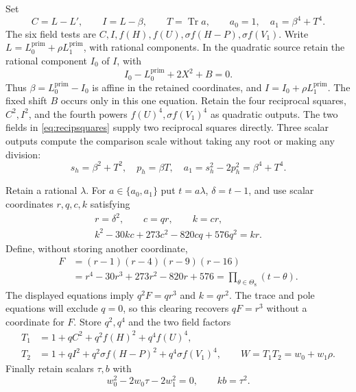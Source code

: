 \documentclass[11pt,a4paper]{article}
\DeclareMathOperator{\Tr}{Tr}\DeclareMathOperator{\Nm}{N}
\begin{document}
Set
\[
 C=L-L',\qquad I=L-\beta,\qquad T=\Tr a,
 \qquad a_0=1,\quad a_1=\beta^4+T^4.
\]
The six field tests are $C,I,f(H),f(U),\sigma f(H-P),\sigma f(V_1)$.
Write $L=L_0^{\mathrm{prim}}+\rho L_1^{\mathrm{prim}}$, with rational components.
In the quadratic source retain the rational component $I_0$ of $I$, with
\[
                  I_0-L_0^{\mathrm{prim}}+2X^2+B=0.
\]
Thus $\beta=L_0^{\mathrm{prim}}-I_0$ is affine in the retained
coordinates, and $I=I_0+\rho L_1^{\mathrm{prim}}$.
The fixed shift $B$ occurs only in this one equation.
Retain the four reciprocal squares, $C^2,I^2$, and the fourth powers
$f(U)^4,\sigma f(V_1)^4$ as quadratic outputs. The two fields in
\eqref{eq:recipsquares} supply two reciprocal squares directly.
Three scalar outputs compute the comparison scale without taking any
root or making any division:
\[
 s_h=\beta^2+T^2,\quad p_h=\beta T,\quad
 a_1=s_h^2-2p_h^2=\beta^4+T^4.
\]

Retain a rational $\lambda$. For $a\in\{a_0,a_1\}$ put $t=a\lambda$,
$\delta=t-1$, and use scalar coordinates $r,q,c,k$ satisfying
\begin{equation}\label{eq:contactcircuit}
 \begin{gathered}
 r=\delta^2,\qquad c=qr,\qquad k=cr,\\
 k^2-30kc+273c^2-820cq+576q^2=kr.
 \end{gathered}
\end{equation}
Define, without storing another coordinate,
\[
 \begin{split}
 F&=(r-1)(r-4)(r-9)(r-16)\\
  &=r^4-30r^3+273r^2-820r+576
    =\prod_{\theta\in\Theta_8}(t-\theta).
 \end{split}
\]
The displayed equations imply $q^2F=qr^3$ and $k=qr^2$.
The trace and pole equations will exclude $q=0$, so this clearing
recovers $qF=r^3$ without a coordinate for $F$.
Store $q^2,q^4$ and the two field factors
\begin{equation}\label{eq:packed}
 \begin{split}
 T_1&=1+qC^2+q^2f(H)^2+q^4f(U)^4,\\
 T_2&=1+qI^2+q^2\sigma f(H-P)^2+q^4\sigma f(V_1)^4,
 \qquad W=T_1T_2=w_0+w_1\rho.
 \end{split}
\end{equation}
Finally retain scalars $\tau,b$ with
\begin{equation}\label{eq:trace}
             w_0^2-2w_0\tau-2w_1^2=0,\qquad
             kb=\tau^2.
\end{equation}
\end{document}
